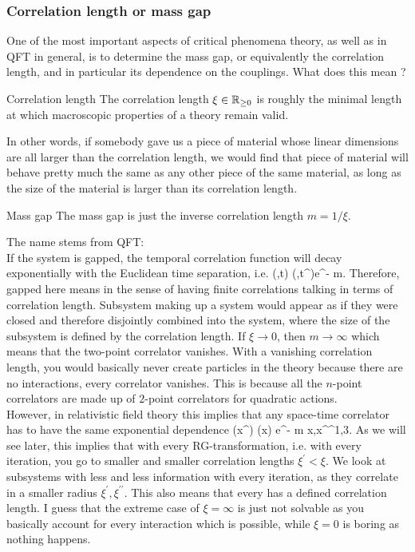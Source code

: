 \subsubsection{Correlation length or mass gap}
One of the most important aspects of critical phenomena theory, as well as in QFT in general, is to determine the mass gap, or equivalently the correlation length, and in particular its dependence on the couplings. What does this mean ?
\\
\begin{mybox}{Correlation length}
	The correlation length $\xi \in \mathbb{R}_{\geq 0}$ is roughly the minimal length at which macroscopic properties of a theory remain valid.
\end{mybox}
In other words, if somebody gave us a piece of material whose linear dimensions are all larger than the correlation length, we would find that piece of material will behave pretty much the same as any other piece of the same material, as long as the size of the material is larger than its correlation length.
\begin{mybox}{Mass gap}
The mass gap is just the inverse correlation length $m = 1/\xi$.
\end{mybox}
The name stems from QFT:\\
If the system is gapped, the temporal correlation function will decay exponentially with the Euclidean time separation, i.e.
\be 
\langle \phi(,t) \phi(,t^\prime)\rangle \approx e^{- m}.
\ee 
Therefore, gapped here means in the sense of having finite correlations talking in terms of correlation length. Subsystem making up a system would appear as if they were closed and therefore disjointly combined into the system, where the size of the subsystem is defined by the correlation length. If $\xi\rightarrow 0$, then $m\rightarrow \infty$ which means that the two-point correlator vanishes. With a vanishing correlation length, you would basically never create particles in the theory because there are no interactions, every correlator vanishes. This is because all the $n$-point correlators are made up of $2$-point correlators for quadratic actions.\\
However, in relativistic field theory this implies that any space-time correlator has to have the same exponential dependence
\be 
\langle \phi(x^\prime) \phi(x) \rangle \approx e^{-  m} \quad x,x^\prime \in \mR^{1,3}.
\ee 
As we will see later, this implies that with every RG-transformation, i.e. with every iteration, you go to smaller and smaller correlation lengths $\xi^\prime < \xi$. We look at subsystems with less and less information with every iteration, as they correlate in a smaller radius $\xi^\prime,\xi^{\prime \prime}$. This also means that every  has a defined correlation length. I guess that the extreme case of $\xi=\infty$ is just not solvable as you basically account for every interaction which is possible, while $\xi=0$ is boring as nothing happens.	

